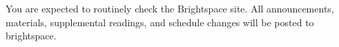 You are expected to routinely check the Brightspace site. All announcements, materials, supplemental readings, and schedule changes will be posted to brightspace.
